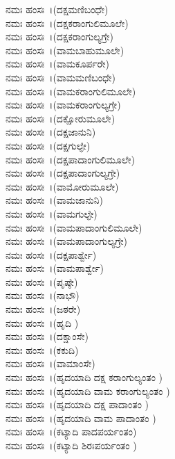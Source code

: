  ನಮಃ ಹಂಸಃ~।(ದಕ್ಷಮಣಿಬಂಧೇ)\\
 ನಮಃ ಹಂಸಃ~।(ದಕ್ಷಕರಾಂಗುಲಿಮೂಲೇ)\\
 ನಮಃ ಹಂಸಃ~।(ದಕ್ಷಕರಾಂಗುಲ್ಯಗ್ರೇ)\\
 ನಮಃ ಹಂಸಃ~।(ವಾಮಬಾಹುಮೂಲೇ)\\
 ನಮಃ ಹಂಸಃ~।(ವಾಮಕೂರ್ಪರೇ)\\
 ನಮಃ ಹಂಸಃ~।(ವಾಮಮಣಿಬಂಧೇ)\\
 ನಮಃ ಹಂಸಃ~।(ವಾಮಕರಾಂಗುಲಿಮೂಲೇ)\\
 ನಮಃ ಹಂಸಃ~।(ವಾಮಕರಾಂಗುಲ್ಯಗ್ರೇ)\\
 ನಮಃ ಹಂಸಃ~।(ದಕ್ಷೋರುಮೂಲೇ)\\
 ನಮಃ ಹಂಸಃ~।(ದಕ್ಷಜಾನುನಿ)\\
 ನಮಃ ಹಂಸಃ~।(ದಕ್ಷಗುಲ್ಫೇ)\\
 ನಮಃ ಹಂಸಃ~।(ದಕ್ಷಪಾದಾಂಗುಲಿಮೂಲೇ)\\
 ನಮಃ ಹಂಸಃ~।(ದಕ್ಷಪಾದಾಂಗುಲ್ಯಗ್ರೇ)\\
 ನಮಃ ಹಂಸಃ~।(ವಾಮೋರುಮೂಲೇ)\\
 ನಮಃ ಹಂಸಃ~।(ವಾಮಜಾನುನಿ)\\
 ನಮಃ ಹಂಸಃ~।(ವಾಮಗುಲ್ಫೇ)\\
 ನಮಃ ಹಂಸಃ~।(ವಾಮಪಾದಾಂಗುಲಿಮೂಲೇ)\\
 ನಮಃ ಹಂಸಃ~।(ವಾಮಪಾದಾಂಗುಲ್ಯಗ್ರೇ)\\
 ನಮಃ ಹಂಸಃ~।(ದಕ್ಷಪಾರ್ಶ್ವೇ)\\
 ನಮಃ ಹಂಸಃ~।(ವಾಮಪಾರ್ಶ್ವೇ)\\
 ನಮಃ ಹಂಸಃ~।(ಪೃಷ್ಠೇ)\\
 ನಮಃ ಹಂಸಃ~।(ನಾಭೌ)\\
 ನಮಃ ಹಂಸಃ~।(ಜಠರೇ)\\
 ನಮಃ ಹಂಸಃ~।(ಹೃದಿ )\\
 ನಮಃ ಹಂಸಃ~।(ದಕ್ಷಾಂಸೇ)\\
 ನಮಃ ಹಂಸಃ~।(ಕಕುದಿ)\\
 ನಮಃ ಹಂಸಃ~।(ವಾಮಾಂಸೇ)\\
 ನಮಃ ಹಂಸಃ~।(ಹೃದಯಾದಿ ದಕ್ಷ ಕರಾಂಗುಲ್ಯಂತಂ )\\
 ನಮಃ ಹಂಸಃ~।(ಹೃದಯಾದಿ ವಾಮ ಕರಾಂಗುಲ್ಯಂತಂ )\\
 ನಮಃ ಹಂಸಃ~।(ಹೃದಯಾದಿ ದಕ್ಷ ಪಾದಾಂತಂ )\\
 ನಮಃ ಹಂಸಃ~।(ಹೃದಯಾದಿ ವಾಮ ಪಾದಾಂತಂ )\\
 ನಮಃ ಹಂಸಃ~।(ಕಟ್ಯಾದಿ ಪಾದಪರ್ಯಂತಂ)\\
 ನಮಃ ಹಂಸಃ~।(ಕಟ್ಯಾದಿ ಶಿರಃಪರ್ಯಂತಂ )\\

